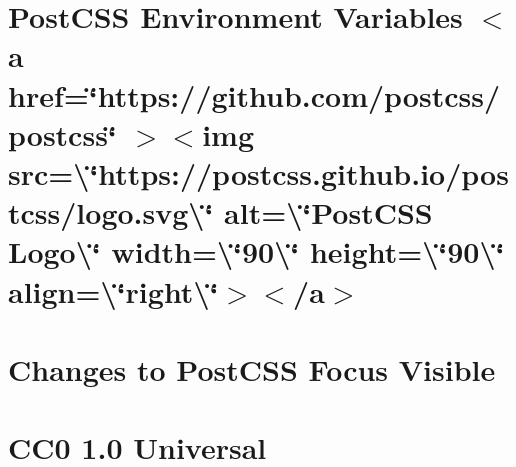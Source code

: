 \documentclass[twoside]{book}
\newcommand{\+}{\discretionary{\mbox{\scriptsize$\hookleftarrow$}}{}{}}
\begin{document}
\chapter{Post\+CSS Environment Variables \texorpdfstring{$<$}{<}a href=\char`\"{}https\+://github.\+com/postcss/postcss\char`\"{} \texorpdfstring{$>$}{>}\texorpdfstring{$<$}{<}img src=\textbackslash{}\char`\"{}https\+://postcss.\+github.\+io/postcss/logo.\+svg\textbackslash{}\char`\"{} alt=\textbackslash{}\char`\"{}\+Post\+CSS Logo\textbackslash{}\char`\"{} width=\textbackslash{}\char`\"{}90\textbackslash{}\char`\"{} height=\textbackslash{}\char`\"{}90\textbackslash{}\char`\"{} align=\textbackslash{}\char`\"{}right\textbackslash{}\char`\"{}\texorpdfstring{$>$}{>}\texorpdfstring{$<$}{<}/a\texorpdfstring{$>$}{>}}
\label{md__c___users_vaishnavi_jadhav__desktop__developer_code_mean_stack_example_client_node_modules_padb3beca268877e02055e18d8fa42d18}

\chapter{Changes to Post\+CSS Focus Visible}
\label{md__c___users_vaishnavi_jadhav__desktop__developer_code_mean_stack_example_client_node_modules_p3089895226339168affa17de1fbbe20f}

\chapter{CC0 1.0 Universal}
\label{md__c___users_vaishnavi_jadhav__desktop__developer_code_mean_stack_example_client_node_modules_p6d0e6d898f868a1e90f7d7a4f3a2e034}

\end{document}
